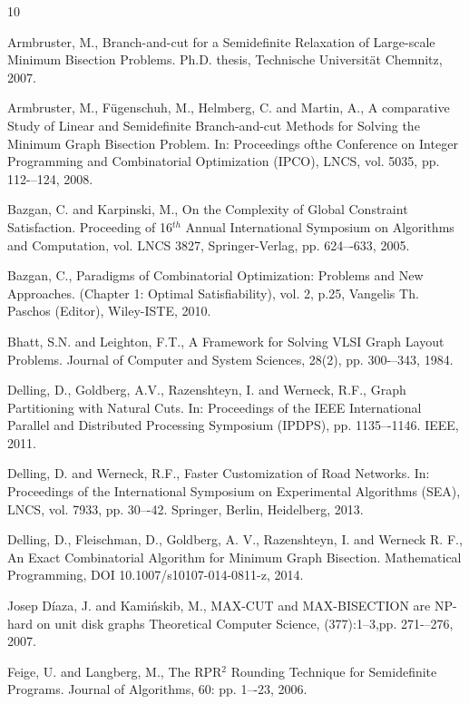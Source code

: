 \documentclass[a4paper]{article}
\begin{document}
\begin{thebibliography}{10}

Armbruster, M.,
Branch-and-cut for a Semidefinite Relaxation of Large-scale Minimum Bisection Problems. 
Ph.D. thesis, Technische Universität Chemnitz, 2007.

Armbruster, M., Fügenschuh, M., Helmberg, C. and Martin, A.,
A comparative Study of Linear and Semidefinite Branch-and-cut Methods for Solving the Minimum Graph Bisection Problem. 
In: Proceedings ofthe Conference on Integer Programming and Combinatorial Optimization (IPCO), LNCS, vol. 5035, pp. 112-–124, 2008.


Bazgan, C. and Karpinski, M., 
On the Complexity of Global Constraint Satisfaction.
Proceeding of 16$^{th}$ Annual International Symposium on Algorithms and Computation,
vol. LNCS 3827, Springer-Verlag, pp. 624–-633, 2005.

Bazgan, C., 
Paradigms of Combinatorial Optimization: Problems and New Approaches. 
(Chapter 1: Optimal Satisfiability), vol. 2, p.25,    
Vangelis Th. Paschos (Editor),  Wiley-ISTE, 2010.

Bhatt, S.N. and Leighton, F.T.,
A Framework for Solving VLSI Graph Layout Problems. 
Journal of Computer and System Sciences, 28(2), pp. 300-–343, 1984.

Delling, D., Goldberg, A.V., Razenshteyn, I. and Werneck, R.F.,
Graph Partitioning with Natural Cuts. 
In: Proceedings of the IEEE International Parallel and Distributed Processing Symposium (IPDPS), pp. 1135–-1146. IEEE, 2011.

Delling, D. and Werneck, R.F.,
Faster Customization of Road Networks. 
In: Proceedings of the International Symposium on Experimental Algorithms (SEA), LNCS, vol. 7933, 
pp. 30–-42. Springer, Berlin, Heidelberg, 2013.

Delling, D., Fleischman, D., Goldberg, A. V., Razenshteyn, I. and Werneck R. F.,
An Exact Combinatorial Algorithm for Minimum Graph Bisection. 
Mathematical Programming, DOI 10.1007/s10107-014-0811-z, 2014.

Josep Díaza, J. and Kamińskib, M., 
MAX-CUT and MAX-BISECTION are NP-hard on unit disk graphs
Theoretical Computer Science, (377):1–3,pp. 271-–276, 2007.

Feige, U. and Langberg, M., 
The RPR$^2$ Rounding Technique for Semidefinite Programs. 
Journal of Algorithms, 60: pp. 1–-23, 2006.


\end{thebibliography}
\end{document}
